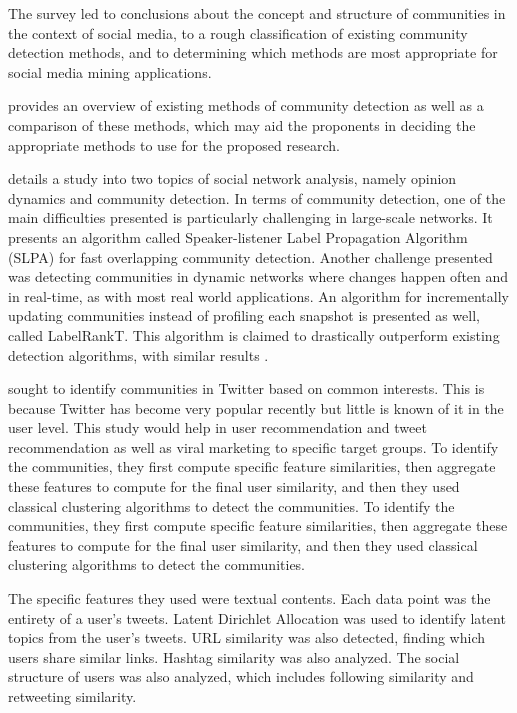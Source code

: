 The survey led to conclusions about the concept and structure of communities in the context of social media, to a rough classification of existing community detection methods, and to determining which methods are most appropriate for social media mining applications. 

 provides an overview of existing methods of community detection as well as a comparison of these methods, which may aid the proponents in deciding the appropriate methods to use for the proposed research.

 details a study into two topics of social network analysis, namely opinion dynamics and community detection. In terms of community detection, one of the main difficulties presented is particularly challenging in large-scale networks. It presents an algorithm called Speaker-listener Label Propagation Algorithm (SLPA) for fast overlapping community detection. Another challenge presented was detecting communities in dynamic networks where changes happen often and in real-time, as with most real world applications. An algorithm for incrementally updating communities instead of profiling each snapshot is presented as well, called LabelRankT. This algorithm is claimed to drastically outperform existing detection algorithms, with similar results \cite{Xie:2012}. 

 sought to identify communities in Twitter based on common interests. This is because Twitter has become very popular recently but little is known of it in the user level. This study would help in user recommendation and tweet recommendation as well as viral marketing to specific target groups. To identify the communities, they first compute specific feature similarities, then aggregate these features to compute for the final user similarity, and then they used classical clustering algorithms to detect the communities. To identify the communities, they first compute specific feature similarities, then aggregate these features to compute for the final user similarity, and then they used classical clustering algorithms to detect the communities.

The specific features they used were textual contents. Each data point was the entirety of a user’s tweets. Latent Dirichlet Allocation was used to identify latent topics from the user’s tweets. URL similarity was also detected, finding which users share similar links. Hashtag similarity was also analyzed. The social structure of users was also analyzed, which includes following similarity and retweeting similarity. 


